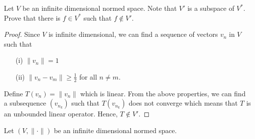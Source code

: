 \documentclass[a4paper]{article}
\begin{document}
\begin{problem}
    Let \( V  \) be an infinite dimensional normed space. Note that \( V'  \) is a subspace of \( V^{*} \). Prove that there is \( f \in V^{*} \) such that \( f \notin V' \). 
\end{problem}
\begin{proof}
    Since \( V  \) is infinite dimensional, we can find a sequence of vectors \( {v}_{n} \) in \( V  \) such that 
    \begin{enumerate}
        \item[(i)] \( \|{v}_{n}\| = 1  \) 
        \item[(ii)] \( \|{v}_{n} - {v}_{m} \| \geq \frac{ 1 }{ 2 }  \) for all \( n \neq m  \).
    \end{enumerate}
    Define \( T({v}_{n}) = \|{v}_{n}\|  \) which is linear. From the above properties, we can find a subsequence \( ({v}_{{n}_{k}}) \) such that \( T({v}_{{n}_{k}}) \) does not converge which means that \( T  \) is an unbounded linear operator. Hence, \( T \notin V' \).
\end{proof}


\begin{problem}
    Let \( (V, \|\cdot\|) \) be an infinite dimensional normed space.
\end{problem}
\end{document}
